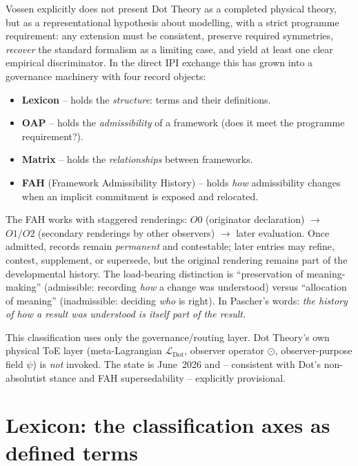 Vossen explicitly does not present Dot Theory as a completed physical theory, but as a representational
hypothesis about modelling, with a strict programme requirement: any extension must be consistent, preserve
required symmetries, \emph{recover} the standard formalism as a limiting case, and yield at least one clear
empirical discriminator. In the direct IPI exchange this has grown into a governance machinery with four
record objects:

\begin{itemize}
\item \textbf{Lexicon} -- holds the \emph{structure}: terms and their definitions.
\item \textbf{OAP} -- holds the \emph{admissibility} of a framework (does it meet the programme requirement?).
\item \textbf{Matrix} -- holds the \emph{relationships} between frameworks.
\item \textbf{FAH} (Framework Admissibility History) -- holds \emph{how} admissibility changes when an
implicit commitment is exposed and relocated.
\end{itemize}

The FAH works with staggered renderings: $O0$ (originator declaration) $\to$ $O1/O2$ (secondary renderings
by other observers) $\to$ later evaluation. Once admitted, records remain \emph{permanent} and contestable;
later entries may refine, contest, supplement, or supersede, but the original rendering remains part of the
developmental history. The load-bearing distinction is \enquote{preservation of meaning-making} (admissible:
recording \emph{how} a change was understood) versus \enquote{allocation of meaning} (inadmissible: deciding
\emph{who} is right). In Pascher's words: \emph{the history of how a result was understood is itself part of
the result.}

This classification uses only the governance/routing layer. Dot Theory's own physical ToE layer
(meta-Lagrangian $\mathcal{L}_{\text{Dot}}$, observer operator $\odot$, observer-purpose field $\psi$) is
\emph{not} invoked. The state is June~2026 and -- consistent with Dot's non-absolutist stance and FAH
supersedability -- explicitly provisional.

\section{Lexicon: the classification axes as defined terms}

